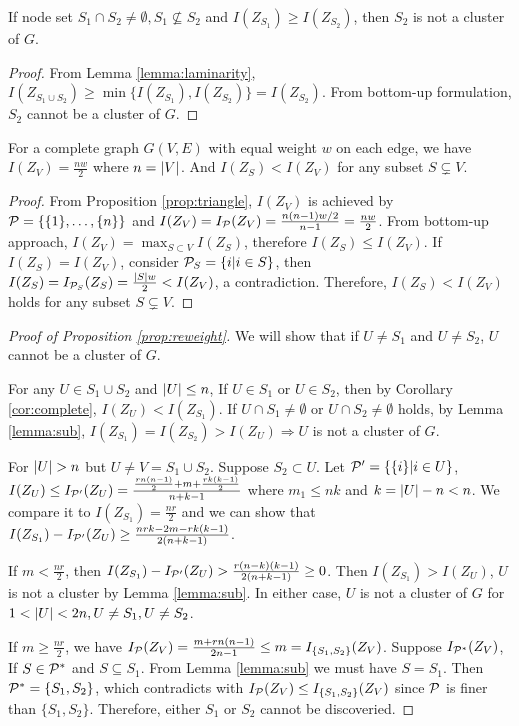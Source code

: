 \begin{lemma}\label{lemma:sub}
	If node set $S_1 \cap S_2 \neq \emptyset, S_1 \not\subseteq S_2$ and $I(Z_{S_1}) \geq I(Z_{S_2})$, then $S_2$ is not a cluster of $G$.
\end{lemma}
\begin{proof}
	From Lemma \ref{lemma:laminarity},
	$I(Z_{S_1\cup S_2}) \geq \min\{I(Z_{S_1}), I(Z_{S_2})\} = I(Z_{S_2})$. From bottom-up formulation,  $S_2$ cannot be a cluster of $G$.
\end{proof}
\begin{corollary}\label{cor:complete}
	For a complete graph $G(V,E)$ with equal weight $w$ on each edge, we have $I(Z_{V})=\frac{nw}{2}$ where $n=\abs{V}$. And $I(Z_S) < I(Z_V)$ for any subset $S\subsetneq V$.
\end{corollary}
\begin{proof}
From Proposition \ref{prop:triangle}, $I(Z_{V})$ is achieved by $\P=\{\{1\},\dots,\{n\} \}$ and $I(Z_V) = I_{\P}(Z_V) = \frac{n(n-1)w/2}{n-1} = \frac{nw}{2} $. From bottom-up approach, $I(Z_V) = \max_{S\subset V} I(Z_S)$, therefore $I(Z_S) \leq I(Z_V)$. If $I(Z_S) = I(Z_V)$, consider $\P_S=\{i | i \in S\}$, then $I(Z_S) = I_{\P_S}(Z_S) = \frac{\abs{S}w}{2} < I(Z_V)$, a contradiction. Therefore, $I(Z_S) < I(Z_V)$ holds for any subset $S\subsetneq V$.
\end{proof}

\begin{proof}[Proof of Proposition \ref{prop:reweight}]
	We will show that if $U \neq S_1$ and $U \neq S_2$, $U$ cannot be a cluster of $G$.
	
For any $U \in S_1 \cup S_2 $ and $\abs{U} \leq n$, If $U \in S_1$ or $U \in S_2$, then by Corollary \ref{cor:complete}, $I(Z_U) < I(Z_{S_1})$.
If $U \cap S_1 \neq \emptyset$ or $U \cap S_2 \neq \emptyset$ holds, by Lemma \ref{lemma:sub}, $I(Z_{S_1})= I(Z_{S_2}) > I(Z_U) \Rightarrow U$ is not a cluster of $G$.

For $\abs{U} > n$ but $U \neq V = S_1 \cup S_2$. Suppose $S_2 \subset U$. Let $\P' = \{\{i\}| i\in U\}$, $I(Z_U) \leq I_{\P'}(Z_U) = \frac{\frac{rn(n-1)}{2} + m + \frac{rk(k-1)}{2}}{n+k-1}$ where $m_1 \leq nk$ and $k=\abs{U} - n < n$. 
We compare it to $I(Z_{S_1}) = \frac{nr}{2}$ and we can show that $I(Z_{S_1}) - I_{\P'}(Z_U) \geq \frac{nrk-2m-rk(k-1)}{2(n+k-1)}$. 

If $m < \frac{nr}{2}$, then $I(Z_{S_1}) - I_{\P'}(Z_U) > \frac{r(n-k)(k-1)}{2(n+k-1)} \geq 0$. Then $I(Z_{S_1})>I(Z_U)$, $U$ is not a cluster by Lemma \ref{lemma:sub}. In either case, $U$ is not a cluster of $G$ for $1<\abs{U}<2n, U \neq S_1, U\neq S_2$. 

If $m \geq \frac{nr}{2}$, we have $I_{\P}(Z_V) = \frac{m+rn(n-1)}{2n-1} \leq m = I_{\{S_1, S_2\}}(Z_V)$. Suppose $I_{\P^*}(Z_V)$, If $S\in \P^*$ and $S\subseteq S_1$. From Lemma \ref{lemma:sub} we must have $S=S_1$. Then $\P^*=\{S_1, S_2\}$, which contradicts with
$I_{\P}(Z_V)  \leq  I_{\{S_1, S_2\}}(Z_V)$ since $\P$ is finer than $\{S_1, S_2\}$. Therefore, either $S_1$ or $S_2$ cannot be discoveried.

\end{proof}

